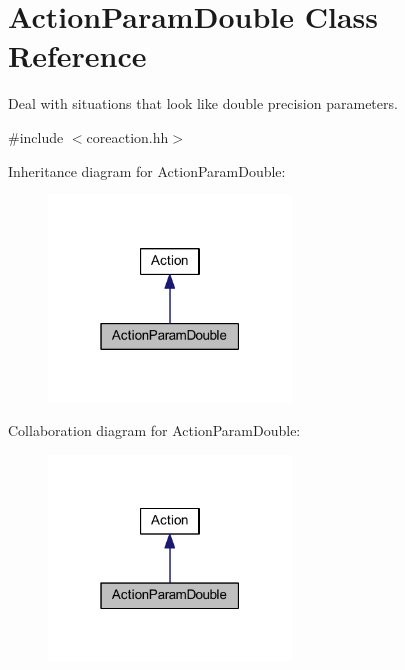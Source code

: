 \hypertarget{class_action_param_double}{}\section{Action\+Param\+Double Class Reference}
\label{class_action_param_double}


Deal with situations that look like double precision parameters.  




{\ttfamily \#include $<$coreaction.\+hh$>$}



Inheritance diagram for Action\+Param\+Double\+:
\nopagebreak
\begin{figure}[H]
\begin{center}
\leavevmode
\includegraphics[width=183pt]{class_action_param_double__inherit__graph}
\end{center}
\end{figure}


Collaboration diagram for Action\+Param\+Double\+:
\nopagebreak
\begin{figure}[H]
\begin{center}
\leavevmode
\includegraphics[width=183pt]{class_action_param_double__coll__graph}
\end{center}
\end{figure}
